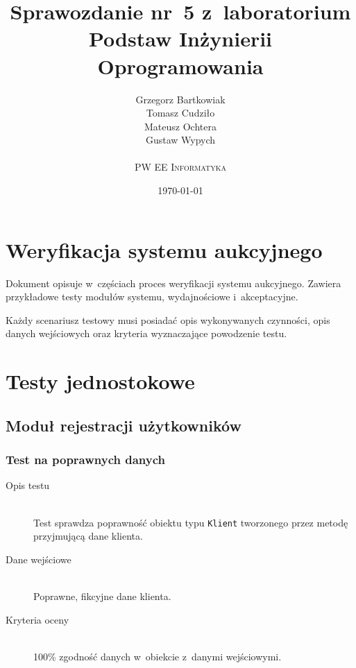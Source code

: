 \documentclass[10pt,a4paper]{article}
\newcommand{\f}[1]{\texttt{#1}}
\begin{document}
\title{
  Sprawozdanie nr~5 z~laboratorium\\Podstaw Inżynierii Oprogramowania
}
\author{
  Grzegorz Bartkowiak\\
  Tomasz Cudziło\\
  Mateusz Ochtera\\
  Gustaw Wypych\\
  \\
  \textsc{PW EE Informatyka}\\[10pt]
}
\date{\today}
\maketitle

\section{Weryfikacja systemu aukcyjnego}

Dokument opisuje w~częściach proces weryfikacji systemu aukcyjnego. Zawiera
przykładowe testy modułów systemu, wydajnościowe i~akceptacyjne.

Każdy scenariusz testowy musi posiadać opis wykonywanych czynności, opis danych
wejściowych oraz kryteria wyznaczające powodzenie testu.

\section{Testy jednostokowe}

\subsection{Moduł rejestracji użytkowników}

\subsubsection{Test na poprawnych danych}
\begin{description}
  \item[Opis testu] \hfill \\
    Test sprawdza poprawność obiektu typu \f{Klient} tworzonego przez metodę
    przyjmującą dane klienta.
  \item[Dane wejściowe] \hfill \\
    Poprawne, fikcyjne dane klienta.
  \item[Kryteria oceny] \hfill \\
    100\% zgodność danych w~obiekcie z~danymi wejściowymi.
\end{description}
\end{document}
